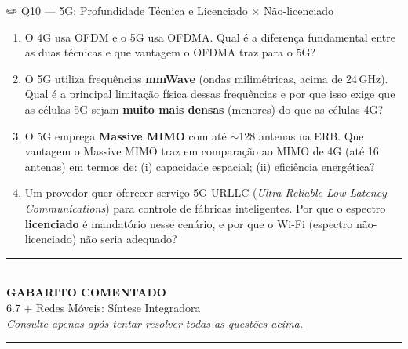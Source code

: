 \documentclass[11pt,a4paper]{article}
\begin{document}
\begin{questao}{✏️ Q10 --- 5G: Profundidade Técnica e Licenciado $\times$ Não-licenciado}
\begin{enumerate}[label=(\alph*)]
    \item O 4G usa OFDM e o 5G usa OFDMA. Qual é a diferença fundamental entre as duas técnicas e que vantagem o OFDMA traz para o 5G?
    \item O 5G utiliza frequências \textbf{mmWave} (ondas milimétricas, acima de 24\,GHz). Qual é a principal limitação física dessas frequências e por que isso exige que as células 5G sejam \textbf{muito mais densas} (menores) do que as células 4G?
    \item O 5G emprega \textbf{Massive MIMO} com até $\sim$128 antenas na ERB. Que vantagem o Massive MIMO traz em comparação ao MIMO de 4G (até 16 antenas) em termos de: (i) capacidade espacial; (ii) eficiência energética?
    \item Um provedor quer oferecer serviço 5G URLLC (\textit{Ultra-Reliable Low-Latency Communications}) para controle de fábricas inteligentes. Por que o espectro \textbf{licenciado} é mandatório nesse cenário, e por que o Wi-Fi (espectro não-licenciado) não seria adequado?
\end{enumerate}
\end{questao}

\clearpage

\begin{center}
\rule{\textwidth}{2.5pt}\\[8pt]
{\LARGE\bfseries GABARITO COMENTADO}\\[4pt]
{\large 6.7 + Redes Móveis: Síntese Integradora}\\[6pt]
{\small\itshape Consulte apenas após tentar resolver todas as questões acima.}\\[8pt]
\rule{\textwidth}{2.5pt}
\end{center}
\vspace{1em}
\end{document}
